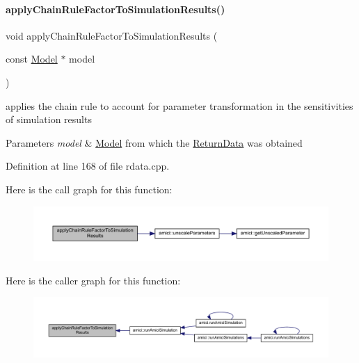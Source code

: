 \paragraph{\texorpdfstring{apply\+Chain\+Rule\+Factor\+To\+Simulation\+Results()}{applyChainRuleFactorToSimulationResults()}}
{\footnotesize\ttfamily void apply\+Chain\+Rule\+Factor\+To\+Simulation\+Results (\begin{DoxyParamCaption}\item[{const \mbox{\hyperlink{classamici_1_1_model}{Model}} $\ast$}]{model }\end{DoxyParamCaption})}

applies the chain rule to account for parameter transformation in the sensitivities of simulation results 
\begin{DoxyParams}{Parameters}
{\em model} & \mbox{\hyperlink{classamici_1_1_model}{Model}} from which the \mbox{\hyperlink{classamici_1_1_return_data}{Return\+Data}} was obtained\\
\hline
\end{DoxyParams}


Definition at line 168 of file rdata.\+cpp.

Here is the call graph for this function\+:
\nopagebreak
\begin{figure}[H]
\begin{center}
\leavevmode
\includegraphics[width=350pt]{classamici_1_1_return_data_adce202dc864a1e65d8453f597de271f5_cgraph}
\end{center}
\end{figure}
Here is the caller graph for this function\+:
\nopagebreak
\begin{figure}[H]
\begin{center}
\leavevmode
\includegraphics[width=350pt]{classamici_1_1_return_data_adce202dc864a1e65d8453f597de271f5_icgraph}
\end{center}
\end{figure}


